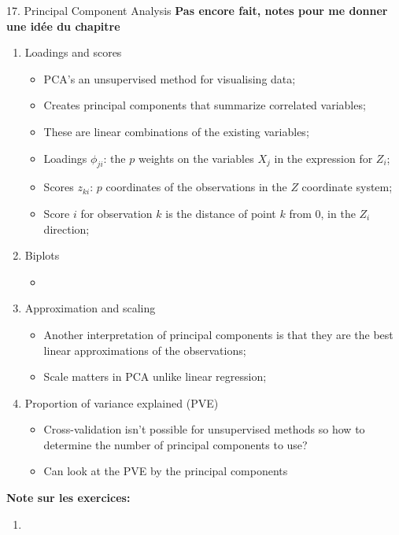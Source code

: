 \documentclass[12pt, titlepage, french]{report}
\begin{document}
\begin{CHPT_SUMM}{17. Principal Component Analysis}
\textbf{Pas encore fait, notes pour me donner une idée du chapitre}
\begin{enumerate}
	\item	Loadings and scores
	\begin{itemize}
		\item	PCA's an unsupervised method for visualising data;
		\item	Creates principal components that summarize correlated variables;
		\item[]	These are linear combinations of the existing variables;
		\item	Loadings $\phi_{ji}$: the $p$ weights on the variables $X_{j}$ in the expression for $Z_{i}$;
		\item	Scores $z_{ki}$: $p$ coordinates of the observations in the $Z$ coordinate system;
		\item[]	Score $i$ for observation $k$ is the distance of point $k$ from $0$, in the $Z_{i}$ direction;
	\end{itemize}
	\item	Biplots
	\begin{itemize}
		\item	
	\end{itemize}
	\item	Approximation and scaling
	\begin{itemize}
		\item	Another interpretation of principal components is that they are the best linear approximations of the observations;
		\item	Scale matters in PCA unlike linear regression;
	\end{itemize}
	\item	Proportion of variance explained (PVE)
	\begin{itemize}
		\item	Cross-validation isn't possible for unsupervised methods so how to determine the number of principal components to use?
		\item	Can look at the PVE by the principal components
	\end{itemize}
\end{enumerate}
\textbf{Note sur les exercices:} 
\begin{enumerate}
	\item	
\end{enumerate}
\end{CHPT_SUMM}
\end{document}
